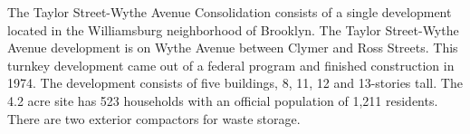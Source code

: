 The Taylor Street-Wythe Avenue Consolidation consists of a single development located in the Williamsburg neighborhood of Brooklyn. The Taylor Street-Wythe Avenue development is on Wythe Avenue between Clymer and Ross Streets. This turnkey development came out of a federal program and finished construction in 1974. The development consists of five buildings, 8, 11, 12 and 13-stories tall. The 4.2 acre site has 523 households with an official population of 1,211 residents. There are two exterior compactors for waste storage.